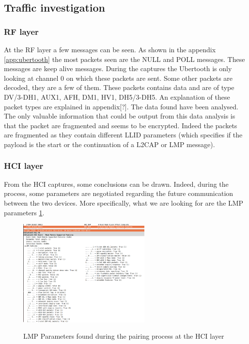 \subsection{Traffic investigation}
\subsubsection{RF layer}
At the RF layer a few messages can be seen. As shown in the appendix \ref{app:ubertooth} the most packets seen are the NULL and POLL messages. These messages are keep alive messages. During the captures the Ubertooth is only looking at channel 0 on which these packets are sent.
Some other packets are decoded, they are a few of them. These packets contains data and are of type DV/3-DH1, AUX1, AFH, DM1, HV1, DH5/3-DH5. An explanation of these packet types are explained in appendix[?]. The data found have been analysed. The only valuable information that could be output from this data analysis is that the packet are fragmented and seems to be encrypted. Indeed the packets are fragmented as they contain different LLID parameters (which specifies if the payload is the start or the continuation of a L2CAP or LMP message).

\subsubsection{HCI layer}
From the HCI captures, some conclusions can be drawn. Indeed, during the process, some parameters are negotiated regarding the future communication between the two devices. More specifically, what we are looking for are the LMP parameters \ref{fig:lmp}. 
\begin{figure}[!h]
  \begin{center}
	\includegraphics[width=250px]{images/LMP_PARAM.png}
	\label{fig:lmp}
	\caption{LMP Parameters found during the pairing process at the HCI layer}
  \end{center}
\end{figure}

